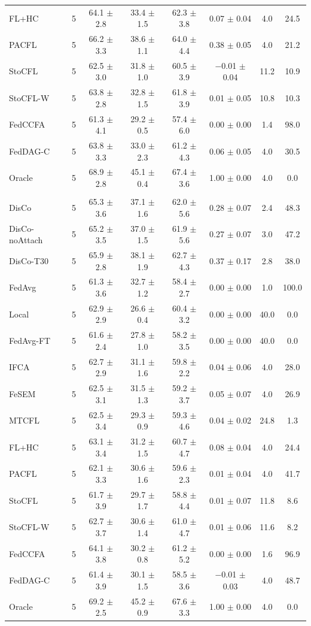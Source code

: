 {\begin{tabular}{l r c c c c c c}
FL+HC & 5 & 64.1 $\pm$ 2.8 & 33.4 $\pm$ 1.5 & 62.3 $\pm$ 3.8 & 0.07 $\pm$ 0.04 & 4.0 & 24.5 \\
PACFL & 5 & 66.2 $\pm$ 3.3 & 38.6 $\pm$ 1.1 & 64.0 $\pm$ 4.4 & 0.38 $\pm$ 0.05 & 4.0 & 21.2 \\
StoCFL & 5 & 62.5 $\pm$ 3.0 & 31.8 $\pm$ 1.0 & 60.5 $\pm$ 3.9 & $-$0.01 $\pm$ 0.04 & 11.2 & 10.9 \\
StoCFL-W & 5 & 63.8 $\pm$ 2.8 & 32.8 $\pm$ 1.5 & 61.8 $\pm$ 3.9 & 0.01 $\pm$ 0.05 & 10.8 & 10.3 \\
FedCCFA & 5 & 61.3 $\pm$ 4.1 & 29.2 $\pm$ 0.5 & 57.4 $\pm$ 6.0 & 0.00 $\pm$ 0.00 & 1.4 & 98.0 \\
FedDAG-C & 5 & 63.8 $\pm$ 3.3 & 33.0 $\pm$ 2.3 & 61.2 $\pm$ 4.3 & 0.06 $\pm$ 0.05 & 4.0 & 30.5 \\
Oracle & 5 & 68.9 $\pm$ 2.8 & 45.1 $\pm$ 0.4 & 67.4 $\pm$ 3.6 & 1.00 $\pm$ 0.00 & 4.0 & 0.0 \\
\addlinespace
\multicolumn{8}{l}{\textit{CIFAR-10 label swap}} \\
DisCo & 5 & 65.3 $\pm$ 3.6 & 37.1 $\pm$ 1.6 & 62.0 $\pm$ 5.6 & 0.28 $\pm$ 0.07 & 2.4 & 48.3 \\
DisCo-noAttach & 5 & 65.2 $\pm$ 3.5 & 37.0 $\pm$ 1.5 & 61.9 $\pm$ 5.6 & 0.27 $\pm$ 0.07 & 3.0 & 47.2 \\
DisCo-T30 & 5 & 65.9 $\pm$ 2.8 & 38.1 $\pm$ 1.9 & 62.7 $\pm$ 4.3 & 0.37 $\pm$ 0.17 & 2.8 & 38.0 \\
FedAvg & 5 & 61.3 $\pm$ 3.6 & 32.7 $\pm$ 1.2 & 58.4 $\pm$ 2.7 & 0.00 $\pm$ 0.00 & 1.0 & 100.0 \\
Local & 5 & 62.9 $\pm$ 2.9 & 26.6 $\pm$ 0.4 & 60.4 $\pm$ 3.2 & 0.00 $\pm$ 0.00 & 40.0 & 0.0 \\
FedAvg-FT & 5 & 61.6 $\pm$ 2.4 & 27.8 $\pm$ 1.0 & 58.2 $\pm$ 3.5 & 0.00 $\pm$ 0.00 & 40.0 & 0.0 \\
IFCA & 5 & 62.7 $\pm$ 2.9 & 31.1 $\pm$ 1.6 & 59.8 $\pm$ 2.2 & 0.04 $\pm$ 0.06 & 4.0 & 28.0 \\
FeSEM & 5 & 62.5 $\pm$ 3.1 & 31.5 $\pm$ 1.3 & 59.2 $\pm$ 3.7 & 0.05 $\pm$ 0.07 & 4.0 & 26.9 \\
MTCFL & 5 & 62.5 $\pm$ 3.4 & 29.3 $\pm$ 0.9 & 59.3 $\pm$ 4.6 & 0.04 $\pm$ 0.02 & 24.8 & 1.3 \\
FL+HC & 5 & 63.1 $\pm$ 3.4 & 31.2 $\pm$ 1.5 & 60.7 $\pm$ 4.7 & 0.08 $\pm$ 0.04 & 4.0 & 24.4 \\
PACFL & 5 & 62.1 $\pm$ 3.3 & 30.6 $\pm$ 1.6 & 59.6 $\pm$ 2.3 & 0.01 $\pm$ 0.04 & 4.0 & 41.7 \\
StoCFL & 5 & 61.7 $\pm$ 3.9 & 29.7 $\pm$ 1.7 & 58.8 $\pm$ 4.4 & 0.01 $\pm$ 0.07 & 11.8 & 8.6 \\
StoCFL-W & 5 & 62.7 $\pm$ 3.7 & 30.6 $\pm$ 1.4 & 61.0 $\pm$ 4.7 & 0.01 $\pm$ 0.06 & 11.6 & 8.2 \\
FedCCFA & 5 & 64.1 $\pm$ 3.8 & 30.2 $\pm$ 0.8 & 61.2 $\pm$ 5.2 & 0.00 $\pm$ 0.00 & 1.6 & 96.9 \\
FedDAG-C & 5 & 61.4 $\pm$ 3.9 & 30.1 $\pm$ 1.5 & 58.5 $\pm$ 3.6 & $-$0.01 $\pm$ 0.03 & 4.0 & 48.7 \\
Oracle & 5 & 69.2 $\pm$ 2.5 & 45.2 $\pm$ 0.9 & 67.6 $\pm$ 3.3 & 1.00 $\pm$ 0.00 & 4.0 & 0.0 \\
\bottomrule
\end{tabular}
}
